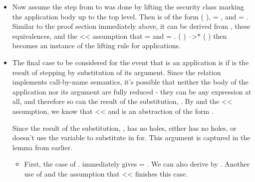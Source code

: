 \documentclass[12pt]{report}
\begin{document}
\begin{itemize}
\item  Now assume the step from  to  was done by lifting the
    security class marking the application body up to the top
    level. Then  is of the form   (  ),
     = , and  = . Similar to the proof section
    immediately above, it can be derived from  , these
    equivalences, and the  <<  assumption that  = 
    and  = .  (  )  -->*
      (  ) then becomes an instance of the
     lifting rule for applications.



\item  The final case to be considered for the event that  is an
    application is if  is the result of  stepping by
    substitution of its argument.  Since the  relation
    implements call-by-name semantics, it's possible that neither the
    body of the application nor its argument are fully reduced - they
    can be any expression at all, and therefore so can the result of
    the substitution, . By  and the  << 
    assumption, we know that  <<  and  is an
    abstraction of the form    .


    Since the result of the substitution, , has no holes, either
     has no holes, or  doesn't use the variable to
    substitute in for. This argument is captured in the
     lemma from earlier. 



\begin{itemize}
\item  First, the case of  . 
      immediately gives  = . We can also derive 
       by . Another use of
       and the assumption that  <<
       finishes this case.




\end{itemize}
\end{itemize}
\end{document}
